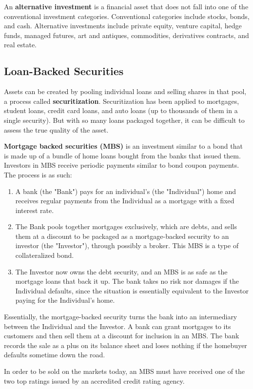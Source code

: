\documentclass{article}
\begin{document}
  \begin{definition}
    An \textbf{alternative investment} is a financial asset that does not fall into one of the conventional investment categories. Conventional categories include stocks, bonds, and cash. Alternative investments include private equity, venture capital, hedge funds, managed futures, art and antiques, commodities, derivatives contracts, and real estate. 
  \end{definition}

  \subsection{Loan-Backed Securities}

    \begin{definition}[Securitization]
      Assets can be created by pooling individual loans and selling shares in that pool, a process called \textbf{securitization}. Securitization has been applied to mortgages, student loans, credit card loans, and auto loans (up to thousands of them in a single security). But with so many loans packaged together, it can be difficult to assess the true quality of the asset. 
    \end{definition}

    \begin{definition}[MBS]
      \textbf{Mortgage backed securities (MBS)} is an investment similar to a bond that is made up of a bundle of home loans bought from the banks that issued them. Investors in MBS receive periodic payments similar to bond coupon payments. The process is as such: 
      \begin{enumerate}
        \item A bank (the "Bank") pays for an individual's (the "Individual") home and receives regular payments from the Individual as a mortgage with a fixed interest rate. 
        \item The Bank pools together mortgages exclusively, which are debts, and sells them at a discount to be packaged as a mortgage-backed security to an investor (the "Investor"), through possibly a broker. This MBS is a type of collateralized bond. 
        \item The Investor now owns the debt security, and an MBS is as safe as the mortgage loans that back it up. The bank takes no risk nor damages if the Individual defaults, since the situation is essentially equivalent to the Investor paying for the Individual's home. 
      \end{enumerate}
      Essentially, the mortgage-backed security turns the bank into an intermediary between the Individual and the Investor. A bank can grant mortgages to its customers and then sell them at a discount for inclusion in an MBS. The bank records the sale as a plus on its balance sheet and loses nothing if the homebuyer defaults sometime down the road. 

      In order to be sold on the markets today, an MBS must have received one of the two top ratings issued by an accredited credit rating agency. 
    \end{definition}
\end{document}
